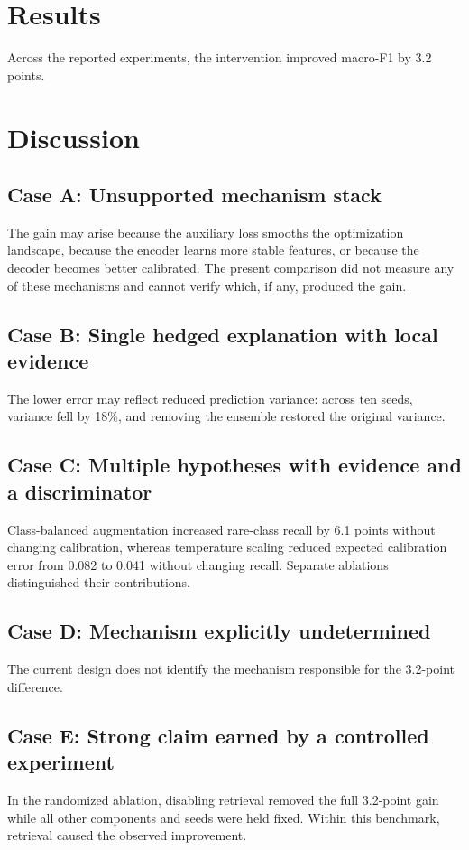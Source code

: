 \section{Results}
Across the reported experiments, the intervention improved macro-F1 by 3.2 points.

\section{Discussion}

\subsection{Case A: Unsupported mechanism stack}
The gain may arise because the auxiliary loss smooths the optimization landscape, because
the encoder learns more stable features, or because the decoder becomes better calibrated.
The present comparison did not measure any of these mechanisms and cannot verify which, if
any, produced the gain.

\subsection{Case B: Single hedged explanation with local evidence}
The lower error may reflect reduced prediction variance: across ten seeds, variance fell by
18\%, and removing the ensemble restored the original variance.

\subsection{Case C: Multiple hypotheses with evidence and a discriminator}
Class-balanced augmentation increased rare-class recall by 6.1 points without changing
calibration, whereas temperature scaling reduced expected calibration error from 0.082 to
0.041 without changing recall. Separate ablations distinguished their contributions.

\subsection{Case D: Mechanism explicitly undetermined}
The current design does not identify the mechanism responsible for the 3.2-point difference.

\subsection{Case E: Strong claim earned by a controlled experiment}
In the randomized ablation, disabling retrieval removed the full 3.2-point gain while all
other components and seeds were held fixed. Within this benchmark, retrieval caused the
observed improvement.
